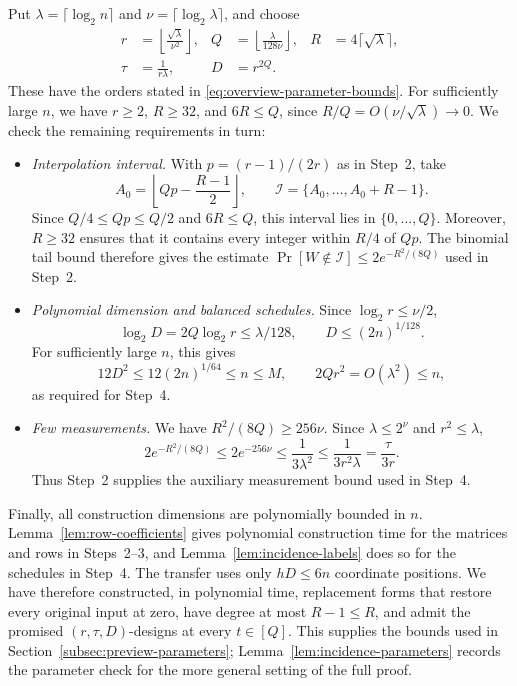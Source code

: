 \documentclass[11pt,reqno]{amsart}
\numberwithin{equation}{section}
\theoremstyle{definition}\newtheorem{definition}[theorem]{Definition}
\theoremstyle{remark}\newtheorem{remark}[theorem]{Remark}
\renewcommand{\le}{\leqslant}
\renewcommand{\ge}{\geqslant}
\begin{document}
Put $\lambda=\lceil\log_2 n\rceil$ and
$\nu=\lceil\log_2\lambda\rceil$, and choose
\begin{equation}\label{eq:overview-explicit-parameters}
 \begin{aligned}
 r&=\left\lfloor\frac{\sqrt\lambda}{\nu^2}\right\rfloor,
 &Q&=\left\lfloor\frac{\lambda}{128\nu}\right\rfloor,
 &R&=4\lceil\sqrt\lambda\rceil,\\
 \tau&=\frac1{r\lambda},
 &D&=r^{2Q}.
 \end{aligned}
\end{equation}
These have the orders stated in \eqref{eq:overview-parameter-bounds}.
For sufficiently large $n$, we have $r\ge2$, $R\ge32$, and
$6R\le Q$, since $R/Q=O(\nu/\sqrt\lambda)\to0$. We check
the remaining requirements in turn:
\begin{itemize}
\item \emph{Interpolation interval.}
With $p=(r-1)/(2r)$ as in Step~2, take
\[
 A_0=\left\lfloor Qp-\frac{R-1}{2}\right\rfloor,\qquad
 \mathcal I=\{A_0,\ldots,A_0+R-1\}.
\]
Since $Q/4\le Qp\le Q/2$ and $6R\le Q$, this interval lies
in $\{0,\ldots,Q\}$. Moreover, $R\ge32$ ensures that it
contains every integer within $R/4$ of $Qp$. The binomial tail
bound therefore gives the estimate
$\Pr[W\notin\mathcal I]\le2e^{-R^2/(8Q)}$ used in Step~2.
\item \emph{Polynomial dimension and balanced schedules.}
Since $\log_2 r\le\nu/2$,
\[
 \log_2 D=2Q\log_2 r\le\lambda/128,\qquad
 D\le(2n)^{1/128}.
\]
For sufficiently large $n$, this gives
\[
 12D^2\le12(2n)^{1/64}\le n\le M,\qquad
 2Qr^2=O(\lambda^2)\le n,
\]
as required for Step~4.
\item \emph{Few measurements.}
We have $R^2/(8Q)\ge256\nu$. Since $\lambda\le2^\nu$ and
$r^2\le\lambda$,
\[
 2e^{-R^2/(8Q)}\le2e^{-256\nu}
 \le\frac1{3\lambda^2}
 \le\frac1{3r^2\lambda}=\frac{\tau}{3r}.
\]
Thus Step~2 supplies the auxiliary measurement bound used
in Step~4.
\end{itemize}

Finally, all construction dimensions are polynomially bounded in
$n$. Lemma~\ref{lem:row-coefficients} gives polynomial construction
time for the matrices and rows in Steps~2--3, and
Lemma~\ref{lem:incidence-labels} does so for the schedules in
Step~4. The transfer uses only $hD\le6n$ coordinate positions.
We have therefore constructed, in polynomial time, replacement
forms that restore every original input at zero, have degree at
most $R-1\le R$, and admit the promised $(r,\tau,D)$-designs
at every $t\in[Q]$. This supplies the bounds used in
Section~\ref{subsec:preview-parameters};
Lemma~\ref{lem:incidence-parameters} records the parameter check
for the more general setting of the full proof.
\end{document}
